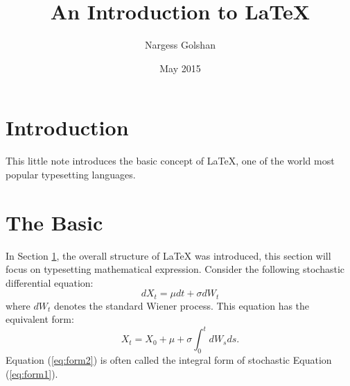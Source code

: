 \documentclass[a4paper,12pt]{article}
\author{Nargess Golshan}
\title{An Introduction to \LaTeX{}}
\date{May 2015}
\begin{document}
		\section{Introduction} \label{sec:intro}
	This little note introduces the basic concept of \LaTeX{}, one of the world most popular typesetting languages. 
	\section{The Basic} \label{sec:basic}
	In Section \ref{sec:intro}, the overall structure of \LaTeX{} was introduced, this section will focus on typesetting mathematical expression. Consider the following stochastic differential equation:
	\begin{equation} \label{eq:form1} 
		dX_t = \mu dt + \sigma dW_t
	\end{equation} 
	\noindent where $dW_t$ denotes the standard Wiener process. This equation has the equivalent form:
	\begin{equation} \label{eq:form2}
		X_t = X_0 + \mu + \sigma \int^t_0 dW_s ds.
	\end{equation} 
	\noindent Equation (\ref{eq:form2}) is often called the integral form of stochastic Equation (\ref{eq:form1}). 
	
\end{document}
